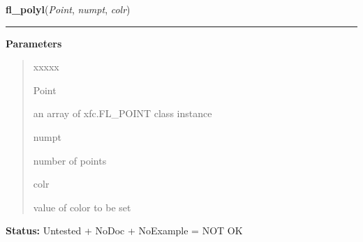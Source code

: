 \hspace{.8\funcindent}\begin{boxedminipage}{\funcwidth}

    \raggedright \textbf{fl\_polyl}(\textit{Point}, \textit{numpt}, \textit{colr})

    \vspace{-1.5ex}

    \rule{\textwidth}{0.5\fboxrule}
\setlength{\parskip}{2ex}
\setlength{\parskip}{1ex}
      \textbf{Parameters}
      \vspace{-1ex}

      \begin{quote}
        \begin{Ventry}{xxxxx}

          \item[Point]

          an array of xfc.FL\_POINT class instance

          \item[numpt]

          number of points

          \item[colr]

          value of color to be set

        \end{Ventry}

      \end{quote}

\textbf{Status:} Untested + NoDoc + NoExample = NOT OK



    \end{boxedminipage}

    \label{xformslib:library:fl_polybound}

    \vspace{0.5ex}


